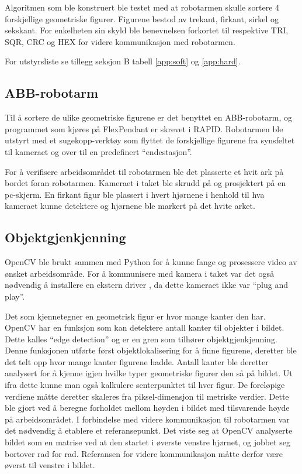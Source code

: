 \documentclass[conference]{IEEEtran}
\begin{document}
    Algoritmen som ble konstruert ble testet med at robotarmen skulle sortere 4 forskjellige geometriske figurer. Figurene bestod av trekant, firkant, sirkel og sekskant. For enkelheten sin skyld ble benevnelsen forkortet til respektive TRI, SQR, CRC og HEX for videre kommunikasjon 
    med robotarmen. 
    
    For utstyrsliste se tillegg seksjon B tabell \ref{app:soft} og \ref{app:hard}. 
    
    \subsection{ABB-robotarm}
        Til å sortere de ulike geometriske figurene er det benyttet en ABB-robotarm, og programmet som kjøres på FlexPendant er skrevet i RAPID. 
        Robotarmen ble utstyrt med et sugekopp-verktøy som flyttet de forskjellige figurene fra synsfeltet til kameraet og over til en predefinert 
        \enquote{endestasjon}. 

        For å verifisere arbeidsområdet til robotarmen ble det plasserte et hvit ark på bordet foran robotarmen. Kameraet i taket ble skrudd på og 
        prosjektert på en pc-skjerm. En firkant figur ble plassert i hvert hjørnene i henhold til hva kameraet kunne detektere og hjørnene ble markert 
        på det hvite arket.

    \subsection{Objektgjenkjenning}
        OpenCV ble brukt sammen med Python for å kunne fange og prosessere video av ønsket arbeidsområde. For å kommunisere med kamera i taket 
        var det også nødvendig å installere en ekstern driver \cite{metode:kamera}, da dette kameraet ikke var “plug and play”.

        Det som kjennetegner en geometrisk figur er hvor mange kanter den har. OpenCV har en funksjon som kan detektere antall kanter til objekter i bildet. Dette kalles \enquote{edge detection} og er en gren som tilhører objektgjenkjenning. Denne funksjonen utførte først objektlokalisering for å finne figurene, deretter ble det telt opp hvor mange kanter figurene hadde. Antall kanter ble deretter analysert for å kjenne igjen hvilke typer geometriske figurer den så på bildet. Ut ifra dette kunne man også kalkulere senterpunktet til hver figur. De foreløpige verdiene måtte deretter skaleres fra piksel-dimensjon til metriske verdier. Dette ble gjort ved å beregne forholdet mellom høyden i bildet med tilsvarende høyde på arbeidsområdet. I forbindelse med videre kommunikasjon til robotarmen var det nødvendig å etablere et referansepunkt.  Det viste seg at OpenCV analyserte bildet som en matrise ved at den startet i øverste venstre hjørnet, og jobbet seg bortover rad for rad. Referansen for videre kommunikasjon måtte derfor være øverst til venstre i bildet.
\end{document}
